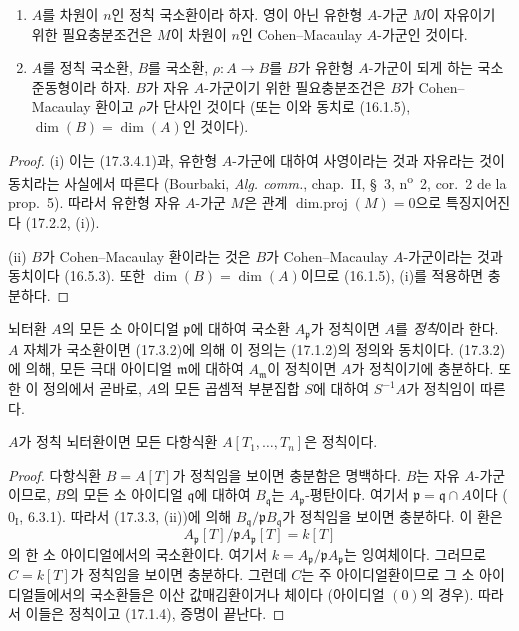 
\begin{corollary}[17.3.5]
\label{0.17.3.5-fr}
\begin{enumerate}
  \item[\rm(i)] $A$를 차원이 $n$인 정칙 국소환이라 하자. 영이 아닌
  유한형 $A$-가군 $M$이 자유이기 위한 필요충분조건은 $M$이 차원이
  $n$인 Cohen--Macaulay $A$-가군인 것이다.
  \item[\rm(ii)] $A$를 정칙 국소환, $B$를 국소환,
  $\rho:A\to B$를 $B$가 유한형 $A$-가군이 되게 하는 국소 준동형이라
  하자. $B$가 자유 $A$-가군이기 위한 필요충분조건은 $B$가
  Cohen--Macaulay 환이고 $\rho$가 단사인 것이다 (또는 이와 동치로
  (16.1.5), $\dim(B)=\dim(A)$인 것이다).
\end{enumerate}
\end{corollary}

\begin{proof}
(i) 이는 (17.3.4.1)과, 유한형 $A$-가군에 대하여 사영이라는 것과
자유라는 것이 동치라는 사실에서 따른다 (Bourbaki,
\emph{Alg. comm.}, chap.~II, \S~3, n\textsuperscript{o}~2, cor.~2 de la
prop.~5). 따라서 유한형 자유 $A$-가군 $M$은 관계
$\operatorname{dim.proj}(M)=0$으로 특징지어진다 (17.2.2, (i)).

(ii) $B$가 Cohen--Macaulay 환이라는 것은 $B$가 Cohen--Macaulay
$A$-가군이라는 것과 동치이다 (16.5.3). 또한
$\dim(B)=\dim(A)$이므로 (16.1.5), (i)를 적용하면 충분하다.
\end{proof}

\begin{env}[17.3.6]
\label{0.17.3.6-fr}
뇌터환 $A$의 모든 소 아이디얼 $\mathfrak{p}$에 대하여 국소환
$A_{\mathfrak{p}}$가 정칙이면 $A$를 \emph{정칙}이라 한다. $A$ 자체가
국소환이면 (17.3.2)에 의해 이 정의는 (17.1.2)의 정의와 동치이다.
(17.3.2)에 의해, 모든 극대 아이디얼 $\mathfrak{m}$에 대하여
$A_{\mathfrak{m}}$이 정칙이면 $A$가 정칙이기에 충분하다. 또한 이
정의에서 곧바로, $A$의 모든 곱셈적 부분집합 $S$에 대하여
$S^{-1}A$가 정칙임이 따른다.
\end{env}

\begin{proposition}[17.3.7]
\label{0.17.3.7-fr}
$A$가 정칙 뇌터환이면 모든 다항식환
$A[T_1,\ldots,T_n]$은 정칙이다.
\end{proposition}

\begin{proof}
다항식환 $B=A[T]$가 정칙임을 보이면 충분함은 명백하다. $B$는 자유
$A$-가군이므로, $B$의 모든 소 아이디얼 $\mathfrak{q}$에 대하여
$B_{\mathfrak{q}}$는 $A_{\mathfrak{p}}$-평탄이다. 여기서
$\mathfrak{p}=\mathfrak{q}\cap A$이다 ($0_{\mathrm I}$, 6.3.1).
따라서 (17.3.3, (ii))에 의해
$B_{\mathfrak{q}}/\mathfrak{p}B_{\mathfrak{q}}$가 정칙임을 보이면
충분하다. 이 환은
\[
  A_{\mathfrak{p}}[T]/\mathfrak{p}A_{\mathfrak{p}}[T]=k[T]
\]
의 한 소 아이디얼에서의 국소환이다. 여기서
$k=A_{\mathfrak{p}}/\mathfrak{p}A_{\mathfrak{p}}$는 잉여체이다.
그러므로 $C=k[T]$가 정칙임을 보이면 충분하다. 그런데 $C$는 주
아이디얼환이므로 그 소 아이디얼들에서의 국소환들은 이산 값매김환이거나
체이다 (아이디얼 $(0)$의 경우). 따라서 이들은 정칙이고 (17.1.4),
증명이 끝난다.
\end{proof}

